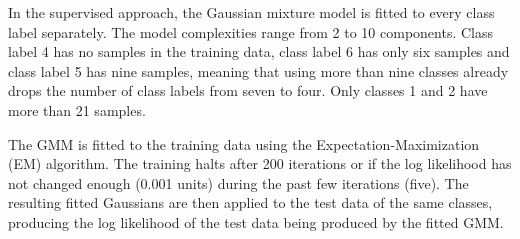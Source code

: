 \documentclass[a4paper]{article}
\begin{document}
In the supervised approach, the Gaussian mixture model is fitted to every
class label separately. The model complexities range from 2 to 10 components.
Class label 4 has no samples in the training data, class label 6 has only six
samples and class label 5 has nine samples, meaning that using more than nine
classes already drops the number of class labels from seven to four. Only
classes 1 and 2 have more than 21 samples.

\par
The GMM is fitted to the training data using the Expectation-Maximization (EM)
algorithm. The training halts after 200 iterations or if the log likelihood
has not changed enough (0.001 units) during the past few iterations (five).
The resulting fitted Gaussians are then applied to the test data of the same
classes, producing the log likelihood of the test data being produced by the
fitted GMM.
\end{document}
